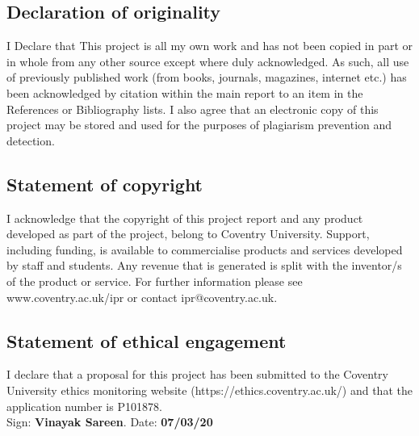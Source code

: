 \subsection*{Declaration of originality}
I Declare that This project is all my own work and has not been copied in part or in whole from any other source except where duly acknowledged.  As such, all use of previously published work (from books, journals, magazines, internet etc.) has been acknowledged by citation within the main report to an item in the References or Bibliography lists. I also agree that an electronic copy of this project may be stored and used for the purposes of plagiarism prevention and detection.
\subsection*{Statement of copyright}
I acknowledge that the copyright of this project report and any product developed as part of the project, belong to Coventry University. 
Support, including funding, is available to commercialise products and services developed by staff and students. 
 Any revenue that is generated is split with the inventor/s of the product or service. 
For further information please see www.coventry.ac.uk/ipr or contact ipr@coventry.ac.uk.
\subsection*{Statement of ethical engagement}

I declare that a proposal for this project has been submitted to the Coventry University ethics monitoring website (https://ethics.coventry.ac.uk/) and that the application number is P101878.
\\ 
\vspace{2mm}
Sign: \textbf{Vinayak Sareen}. \hspace{20mm}  Date:  \textbf{07/03/20}

